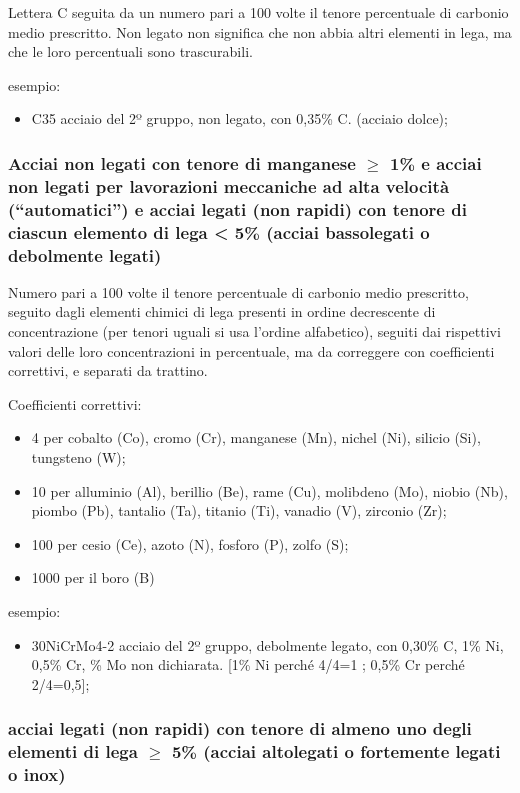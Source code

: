 Lettera C seguita da un numero pari a 100 volte il tenore percentuale di carbonio medio prescritto. Non legato non significa che non abbia altri elementi in lega, ma che le loro percentuali sono trascurabili.

esempio:
\begin{itemize}
    \item C35 acciaio del 2º gruppo, non legato, con 0,35\% C. (acciaio dolce);
\end{itemize}

\subsubsection{Acciai non legati con tenore di manganese $\ge$ 1\% e acciai non legati per lavorazioni meccaniche ad alta velocità (“automatici”) e acciai legati (non rapidi) con tenore di ciascun elemento di lega < 5\% (acciai bassolegati o debolmente legati)}

Numero pari a 100 volte il tenore percentuale di carbonio medio prescritto, seguito dagli elementi chimici di lega presenti in ordine decrescente di concentrazione (per tenori uguali si usa l'ordine alfabetico), seguiti dai rispettivi valori delle loro concentrazioni in percentuale, ma da correggere con coefficienti correttivi, e separati da trattino.

Coefficienti correttivi:
\begin{itemize}
    \item 4 per cobalto (Co), cromo (Cr), manganese (Mn), nichel (Ni), silicio (Si), tungsteno (W);
    \item 10 per alluminio (Al), berillio (Be), rame (Cu), molibdeno (Mo), niobio (Nb), piombo (Pb), tantalio (Ta), titanio (Ti), vanadio (V), zirconio (Zr);
    \item 100 per cesio (Ce), azoto (N), fosforo (P), zolfo (S);
    \item 1000 per il boro (B)
\end{itemize}

esempio: 
\begin{itemize}
    \item 30NiCrMo4-2 acciaio del 2º gruppo, debolmente legato, con 0,30\% C, 1\% Ni, 0,5\% Cr, \% Mo non dichiarata. [1\% Ni perché 4/4=1 ; 0,5\% Cr perché 2/4=0,5];
\end{itemize}

 \subsubsection{acciai legati (non rapidi) con tenore di almeno uno degli elementi di lega $\ge$ 5\% (acciai altolegati o fortemente legati o inox)}

